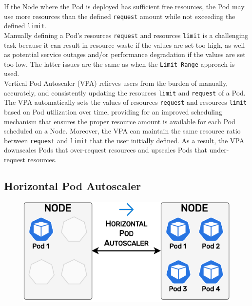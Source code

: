 If the Node where the Pod is deployed has sufficient free resources, the Pod may
use more resources than the defined \texttt{request} amount while not exceeding
the defined \texttt{limit}. \\ %
Manually defining a Pod's resources \texttt{request} and resources \texttt{limit}
is a challenging task because it can result in resource waste if the values are set
too high, as well as potential service outages and/or performance degradation if
the values are set too low. The latter issues are the same as when the \texttt{Limit
Range} approach is used. \\ %
Vertical Pod Autoscaler (VPA) relieves users from the burden of manually, accurately,
and consistently updating the resources \texttt{limit} and \texttt{request} of a
Pod. The VPA automatically sets the values of resources \texttt{request} and
resources \texttt{limit} based on Pod utilization over time, providing for an
improved scheduling mechanism that ensures the proper resource amount is
available for each Pod scheduled on a Node. Moreover, the VPA can maintain the
same resource ratio between \texttt{request} and \texttt{limit} that the user
initially defined. As a result, the VPA downscales Pods that over-request
resources and upscales Pods that under-request resources.

\clearpage


\subsection{Horizontal Pod Autoscaler}
\label{subsec:implementation_autoscaling_horizontal_pod_autoscaler}

\begin{figure}
  \centering
  \includegraphics[width=\linewidth]{
    images/implementation/horizontal_pod_autoscaler.pdf
  }
\end{figure}

